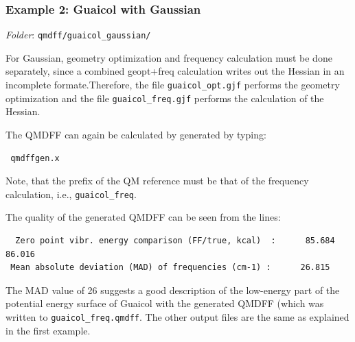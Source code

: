 \documentclass[12pt,a4paper]{scrartcl}
\begin{document}
\subsubsection{Example 2: Guaicol with Gaussian} 

\textit{Folder}: \texttt{qmdff/guaicol\_gaussian/} \newline

For Gaussian, geometry optimization and frequency calculation must be done separately, 
since a combined geopt+freq calculation writes out the Hessian in an incomplete formate.Therefore, the file \texttt{guaicol\_opt.gjf} performs the geometry optimization 
and the file \texttt{guaicol\_freq.gjf} performs the calculation of the Hessian.

The QMDFF can again be calculated by generated by typing:

\begin{verbatim}
 qmdffgen.x
\end{verbatim}

Note, that the prefix of the QM reference must be that of the frequency calculation, i.e.,
\texttt{guaicol\_freq}. 

The quality of the generated QMDFF can be seen from the lines:

\begin{verbatim}
  Zero point vibr. energy comparison (FF/true, kcal)  :      85.684      86.016
 Mean absolute deviation (MAD) of frequencies (cm-1) :      26.815
\end{verbatim}

The MAD value of 26 suggests a good description of the low-energy part of the 
potential energy surface of Guaicol with the generated QMDFF (which was written 
to \texttt{guaicol\_freq.qmdff}. 
The other output files are the same as explained in the first example. 
\end{document}
